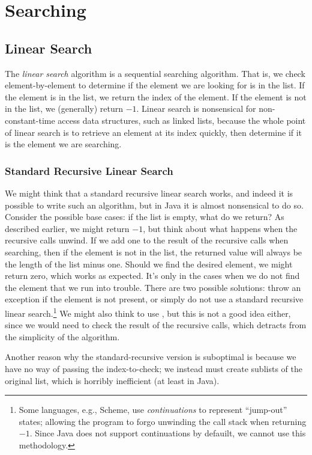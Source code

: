 \section{Searching}

\subsection{Linear Search}
The \emph{linear search} algorithm is a sequential searching algorithm. That is, we check element-by-element to determine if the element we are looking for is in the list. If the element is in the list, we return the index of the element. If the element is not in the list, we (generally) return $-1$. Linear search is nonsensical for non-constant-time access data structures, such as linked lists, because the whole point of linear search is to retrieve an element at its index quickly, then determine if it is the element we are searching. 

\subsubsection*{Standard Recursive Linear Search}
We might think that a standard recursive linear search works, and indeed it is possible to write such an algorithm, but in Java it is almost nonsensical to do so. Consider the possible base cases: if the list is empty, what do we return? As described earlier, we might return $-1$, but think about what happens when the recursive calls unwind. If we add one to the result of the recursive calls when searching, then if the element is not in the list, the returned value will always be the length of the list minus one. Should we find the desired element, we might return zero, which works as expected. It's only in the cases when we do not find the element that we run into trouble. There are two possible solutions: throw an exception if the element is not present, or simply do not use a standard recursive linear search.\footnote{Some languages, e.g., Scheme, use \emph{continuations} to represent ``jump-out'' states; allowing the program to forgo unwinding the call stack when returning $-1$. Since Java does not support continuations by defauilt, we cannot use this methodology.} We might also think to use , but this is not a good idea either, since we would need to check the result of the recursive calls, which detracts from the simplicity of the algorithm.

Another reason why the standard-recursive version is suboptimal is because we have no way of passing the index-to-check; we instead must create sublists of the original list, which is horribly inefficient (at least in Java).

